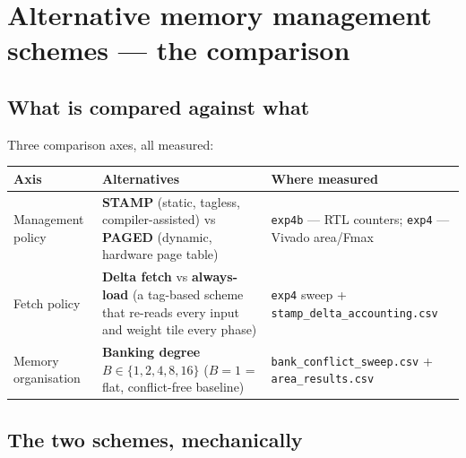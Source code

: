 \documentclass[11pt,a4paper]{article}
\newcommand{\file}[1]{\texttt{\small #1}}
\begin{document}
\section{Alternative memory management schemes --- the comparison}
\label{sec:compare}

\subsection{What is compared against what}

Three comparison axes, all measured:

\begin{center}
\small
\begin{tabular}{@{}p{2.6cm}p{5.2cm}p{7.4cm}@{}}
\toprule
\textbf{Axis} & \textbf{Alternatives} & \textbf{Where measured} \\
\midrule
Management policy & \textbf{STAMP} (static, tagless, compiler-assisted)
                    vs \textbf{PAGED} (dynamic, hardware page table)
                  & \file{exp4b} --- RTL counters; \file{exp4} --- Vivado area/Fmax \\
Fetch policy      & \textbf{Delta fetch} vs \textbf{always-load}
                    (a tag-based scheme that re-reads every input and weight
                    tile every phase)
                  & \file{exp4} sweep + \file{stamp\_delta\_accounting.csv} \\
Memory organisation & \textbf{Banking degree} $B \in \{1,2,4,8,16\}$
                    ($B{=}1$ = flat, conflict-free baseline)
                  & \file{bank\_conflict\_sweep.csv} + \file{area\_results.csv} \\
\bottomrule
\end{tabular}
\end{center}

\subsection{The two schemes, mechanically}
\end{document}
